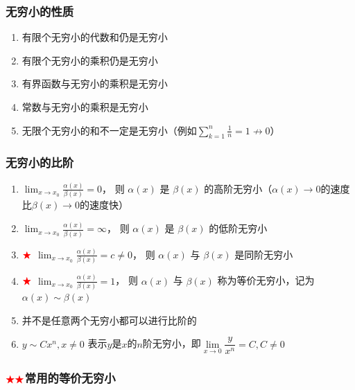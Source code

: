 \documentclass[../book.tex]{subfiles}
\begin{document}
    \subsubsection{无穷小的性质}

    \begin{enumerate}
        \item 有限个无穷小的代数和仍是无穷小
        \item 有限个无穷小的乘积仍是无穷小
        \item 有界函数与无穷小的乘积是无穷小
        \item 常数与无穷小的乘积是无穷小
        \item 无限个无穷小的和不一定是无穷小（例如$\displaystyle\sum_{k=1}^{n}\frac{1}{n} = 1 \not\to 0$）
    \end{enumerate}

    \subsubsection{无穷小的比阶}

    \begin{enumerate}
        \item $\displaystyle \lim_{x\to x_0}\frac{\alpha(x)}{\beta(x)}=0$， 则 $\alpha(x)$ 是 $\beta(x)$ 的高阶无穷小（$\alpha(x) \to 0$的速度比$\beta(x) \to 0$的速度快）
        \item $\displaystyle \lim_{x\to x_0}\frac{\alpha(x)}{\beta(x)}=\infty$， 则 $\alpha(x)$ 是 $\beta(x)$ 的低阶无穷小
        \item $\color{red}{\bigstar}$ $\displaystyle \lim_{x\to x_0}\frac{\alpha(x)}{\beta(x)}=c\neq 0$， 则 $\alpha(x)$ 与 $\beta(x)$ 是同阶无穷小
        \item $\color{red}{\bigstar}$ $\displaystyle \lim_{x\to x_0}\frac{\alpha(x)}{\beta(x)}=1$， 则  $\alpha(x)$ 与 $\beta(x)$ 称为等价无穷小，记为$\alpha(x) \sim \beta(x)$
        \item 并不是任意两个无穷小都可以进行比阶的
        \item $y \sim Cx^n, x\neq 0$ 表示$y$是$x$的$n$阶无穷小，即$\lim\limits_{x\to 0} \dfrac{y}{x^n} = C, C\neq 0$
    \end{enumerate}

    \subsubsection{$\color{red}{\bigstar\bigstar}$常用的等价无穷小}
\end{document}

